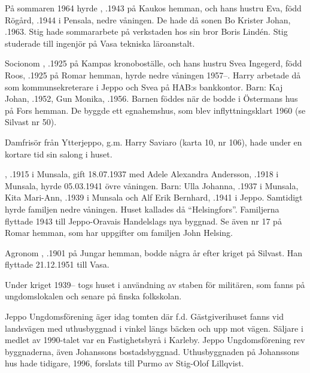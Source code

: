 På sommaren 1964 hyrde , .1943 på Kaukos hemman, och hans hustru Eva, född Rögård, .1944 i Pensala, nedre våningen. De hade då sonen Bo Krister Johan, .1963. Stig hade sommararbete på verkstaden hos sin bror Boris Lindén. Stig studerade till ingenjör på Vasa tekniska läroanstalt.

Socionom , .1925 på Kampas kronoboställe, och hans hustru Svea Ingegerd, född Roos, .1925 på Romar hemman, hyrde nedre våningen 1957--. Harry arbetade då som kommunsekreterare i Jeppo och Svea på HAB:s bankkontor.	Barn:	Kaj Johan, .1952, 	Gun Monika,	.1956.	Barnen föddes när de bodde i Östermans hus på Fors hemman. De byggde ett egnahemshus, som blev inflyttningsklart 1960 (se Silvast nr 50).

Damfrisör  från Ytterjeppo, g.m. Harry Saviaro (karta 10, nr 106), hade under en kortare tid sin salong i huset.

, .1915 i Munsala, gift 18.07.1937 med Adele Alexandra Andersson, .1918 i Munsala, hyrde 05.03.1941  övre våningen. Barn: Ulla Johanna,	.1937 i Munsala, Kita Mari-Ann, .1939 i Munsala och 	Alf Erik Bernhard, .1941 i Jeppo. Samtidigt hyrde familjen  nedre våningen. Huset kallades då ``Helsingfors''. Familjerna flyttade 1943 till Jeppo-Oravais Handelslags nya byggnad. Se även nr 17 på Romar hemman, som har uppgifter om familjen John Helsing.

Agronom , .1901 på Jungar hemman, bodde några år efter kriget på Silvast. Han flyttade 21.12.1951 till Vasa.

Under kriget 1939-- togs huset i användning av staben för militären, som fanns på ungdomslokalen och senare på finska folkskolan.




%
Jeppo Ungdomsförening äger idag tomten där f.d. Gästgiverihuset	fanns vid landsvägen med uthusbyggnad i vinkel längs bäcken och upp 	mot vägen. Säljare i medlet av 1990-talet var en Fastighetsbyrå i Karleby. Jeppo Ungdomsförening rev byggnaderna, även Johanssons bostadsbyggnad. Uthusbyggnaden på Johanssons hus hade tidigare, 1996, forslats till Purmo av Stig-Olof Lillqvist.

